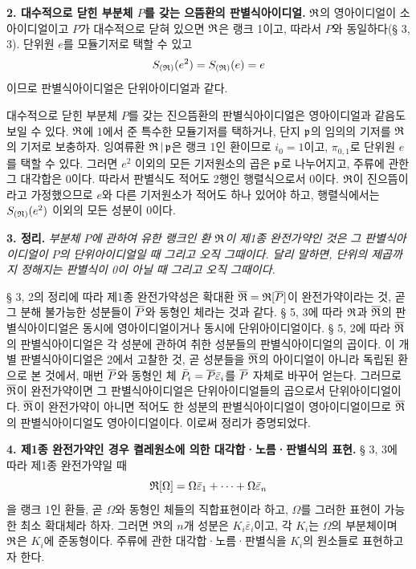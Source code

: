 \textbf{2. 대수적으로 닫힌 부분체 \(P\)를 갖는 으뜸환의 판별식아이디얼.} \(\mathfrak{R}\)의 영아이디얼이 소아이디얼이고 \(P\)가 대수적으로 닫혀 있으면 \(\mathfrak{R}\)은 랭크 1이고, 따라서 \(P\)와 동일하다(§ 3, 3). 단위원 \(e\)를 모듈기저로 택할 수 있고
\[
S_{(\mathfrak{R})}(e^2)=S_{(\mathfrak{R})}(e)=e
\]
이므로 판별식아이디얼은 단위아이디얼과 같다.

대수적으로 닫힌 부분체 \(P\)를 갖는 진으뜸환의 판별식아이디얼은 영아이디얼과 같음도 보일 수 있다. \(\mathfrak{R}\)에 1에서 준 특수한 모듈기저를 택하거나, 단지 \(\mathfrak p\)의 임의의 기저를 \(\mathfrak{R}\)의 기저로 보충하자. 잉여류환 \(\mathfrak{R}\,|\,\mathfrak p\)은 랭크 1인 환이므로 \(i_0=1\)이고, \(\pi_{0,1}\)로 단위원 \(e\)를 택할 수 있다. 그러면 \(e^2\) 이외의 모든 기저원소의 곱은 \(\mathfrak p\)로 나누어지고, 주류에 관한 그 대각합은 0이다. 따라서 판별식도 적어도 2행인 행렬식으로서 0이다. \(\mathfrak{R}\)이 진으뜸이라고 가정했으므로 \(e\)와 다른 기저원소가 적어도 하나 있어야 하고, 행렬식에서는 \(S_{(\mathfrak{R})}(e^2)\) 이외의 모든 성분이 0이다.

\textbf{3. 정리.} \emph{부분체 \(P\)에 관하여 유한 랭크인 환 \(\mathfrak{R}\)이 제1종 완전가약인 것은 그 판별식아이디얼이 \(P\)의 단위아이디얼일 때 그리고 오직 그때이다. 달리 말하면, 단위의 제곱까지 정해지는 판별식이 0이 아닐 때 그리고 오직 그때이다.}

§ 3, 2의 정리에 따라 제1종 완전가약성은 확대환 \(\overline{\mathfrak R}=\mathfrak{R}[\overline P]\)이 완전가약이라는 것, 곧 그 분해 불가능한 성분들이 \(\overline P\)와 동형인 체라는 것과 같다. § 5, 3에 따라 \(\mathfrak{R}\)과 \(\overline{\mathfrak R}\)의 판별식아이디얼은 동시에 영아이디얼이거나 동시에 단위아이디얼이다. § 5, 2에 따라 \(\overline{\mathfrak R}\)의 판별식아이디얼은 각 성분에 관하여 취한 성분들의 판별식아이디얼의 곱이다. 이 개별 판별식아이디얼은 2에서 고찰한 것, 곧 성분들을 \(\overline{\mathfrak R}\)의 아이디얼이 아니라 독립된 환으로 본 것에서, 매번 \(\overline P\)와 동형인 체 \(\bar P_i=\overline P\bar\varepsilon_i\)를 \(\overline P\) 자체로 바꾸어 얻는다. 그러므로 \(\overline{\mathfrak R}\)이 완전가약이면 그 판별식아이디얼은 단위아이디얼들의 곱으로서 단위아이디얼이다. \(\overline{\mathfrak R}\)이 완전가약이 아니면 적어도 한 성분의 판별식아이디얼이 영아이디얼이므로 \(\overline{\mathfrak R}\)의 판별식아이디얼도 영아이디얼이다. 이로써 정리가 증명되었다.

\textbf{4. 제1종 완전가약인 경우 켤레원소에 의한 대각합·노름·판별식의 표현.} § 3, 3에 따라 제1종 완전가약일 때
\[
\mathfrak{R}[\Omega]=\Omega\bar\varepsilon_1+\cdots+\Omega\bar\varepsilon_n
\]
을 랭크 1인 환들, 곧 \(\Omega\)와 동형인 체들의 직합표현이라 하고, \(\Omega\)를 그러한 표현이 가능한 최소 확대체라 하자. 그러면 \(\mathfrak{R}\)의 \(n\)개 성분은 \(K_i\bar\varepsilon_i\)이고, 각 \(K_i\)는 \(\Omega\)의 부분체이며 \(\mathfrak{R}\)은 \(K_i\)에 준동형이다. 주류에 관한 대각합·노름·판별식을 \(K_i\)의 원소들로 표현하고자 한다.

